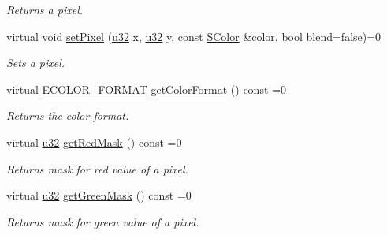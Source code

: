 \begin{DoxyCompactItemize}
\begin{DoxyCompactList}\small\item\em Returns a pixel. \end{DoxyCompactList}\item 
\mbox{\label{classirr_1_1video_1_1IImage_a89bf6020ce6ac1066e4d585ce46f79bd}} 
virtual void \hyperlink{classirr_1_1video_1_1IImage_a89bf6020ce6ac1066e4d585ce46f79bd}{set\+Pixel} (\hyperlink{namespaceirr_a0416a53257075833e7002efd0a18e804}{u32} x, \hyperlink{namespaceirr_a0416a53257075833e7002efd0a18e804}{u32} y, const \hyperlink{classirr_1_1video_1_1SColor}{S\+Color} \&color, bool blend=false)=0
\begin{DoxyCompactList}\small\item\em Sets a pixel. \end{DoxyCompactList}\item 
\mbox{\label{classirr_1_1video_1_1IImage_ad045a8d172047411d03e167b201ae8a6}} 
virtual \hyperlink{namespaceirr_1_1video_a1d5e487888c32b1674a8f75116d829ed}{E\+C\+O\+L\+O\+R\+\_\+\+F\+O\+R\+M\+AT} \hyperlink{classirr_1_1video_1_1IImage_ad045a8d172047411d03e167b201ae8a6}{get\+Color\+Format} () const =0
\begin{DoxyCompactList}\small\item\em Returns the color format. \end{DoxyCompactList}\item 
\mbox{\label{classirr_1_1video_1_1IImage_aaf3a93ad19466928da82f54d8f286990}} 
virtual \hyperlink{namespaceirr_a0416a53257075833e7002efd0a18e804}{u32} \hyperlink{classirr_1_1video_1_1IImage_aaf3a93ad19466928da82f54d8f286990}{get\+Red\+Mask} () const =0
\begin{DoxyCompactList}\small\item\em Returns mask for red value of a pixel. \end{DoxyCompactList}\item 
\mbox{\label{classirr_1_1video_1_1IImage_a1a12d75385fa9e0a063141c9ae0e4289}} 
virtual \hyperlink{namespaceirr_a0416a53257075833e7002efd0a18e804}{u32} \hyperlink{classirr_1_1video_1_1IImage_a1a12d75385fa9e0a063141c9ae0e4289}{get\+Green\+Mask} () const =0
\begin{DoxyCompactList}\small\item\em Returns mask for green value of a pixel. \end{DoxyCompactList}\item 

\end{DoxyCompactItemize}
